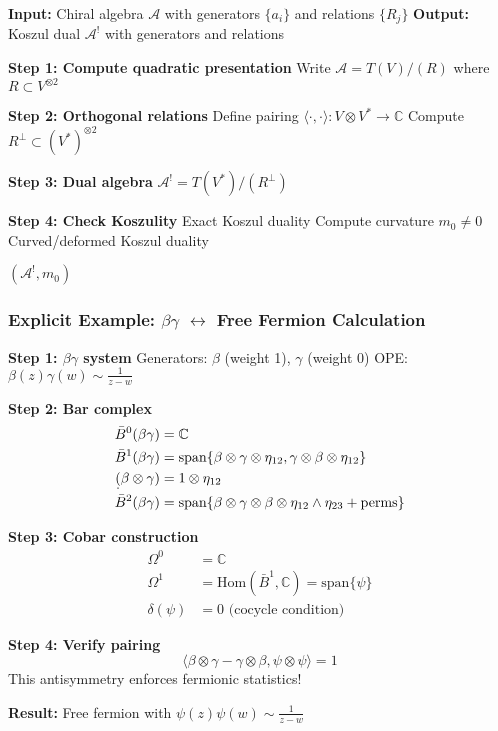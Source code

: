 \begin{algorithm}
\begin{algorithmic}
\STATE \textbf{Input:} Chiral algebra $\mathcal{A}$ with generators $\{a_i\}$ and relations $\{R_j\}$
\STATE \textbf{Output:} Koszul dual $\mathcal{A}^!$ with generators and relations

\STATE \textbf{Step 1: Compute quadratic presentation}
\STATE Write $\mathcal{A} = T(V)/(R)$ where $R \subset V^{\otimes 2}$

\STATE \textbf{Step 2: Orthogonal relations}
\STATE Define pairing $\langle \cdot, \cdot \rangle: V \otimes V^* \to \mathbb{C}$
\STATE Compute $R^\perp \subset (V^*)^{\otimes 2}$

\STATE \textbf{Step 3: Dual algebra}
\STATE $\mathcal{A}^! = T(V^*)/(R^\perp)$

\STATE \textbf{Step 4: Check Koszulity}
    \STATE Exact Koszul duality
\ELSE
    \STATE Compute curvature $m_0 \neq 0$
    \STATE Curved/deformed Koszul duality
\ENDIF

\RETURN $(\mathcal{A}^!, m_0)$
\end{algorithmic}
\end{algorithm}

\subsubsection{Explicit Example: $\beta\gamma$ $\leftrightarrow$ Free Fermion Calculation}

\begin{calculation}
\textbf{Step 1: $\beta\gamma$ system}
Generators: $\beta$ (weight 1), $\gamma$ (weight 0)
OPE: $\beta(z)\gamma(w) \sim \frac{1}{z-w}$

\textbf{Step 2: Bar complex}
\begin{align}
\bar{B}^0(\beta\gamma) &= \mathbb{C} \\
\bar{B}^1(\beta\gamma) &= \text{span}\{\beta \otimes \gamma \otimes \eta_{12}, \gamma \otimes \beta \otimes \eta_{12}\} \\
\d(\beta \otimes \gamma) &= 1 \otimes \eta_{12} \\
\bar{B}^2(\beta\gamma) &= \text{span}\{\beta \otimes \gamma \otimes \beta \otimes \eta_{12} \wedge \eta_{23} + \text{perms}\}
\end{align}

\textbf{Step 3: Cobar construction}
\begin{align}
\Omega^0 &= \mathbb{C} \\
\Omega^1 &= \text{Hom}(\bar{B}^1, \mathbb{C}) = \text{span}\{\psi\} \\
\delta(\psi) &= 0 \text{ (cocycle condition)}
\end{align}

\textbf{Step 4: Verify pairing}
$$\langle \beta \otimes \gamma - \gamma \otimes \beta, \psi \otimes \psi \rangle = 1$$
This antisymmetry enforces fermionic statistics!

\textbf{Result:} Free fermion with $\psi(z)\psi(w) \sim \frac{1}{z-w}$
\end{calculation}

